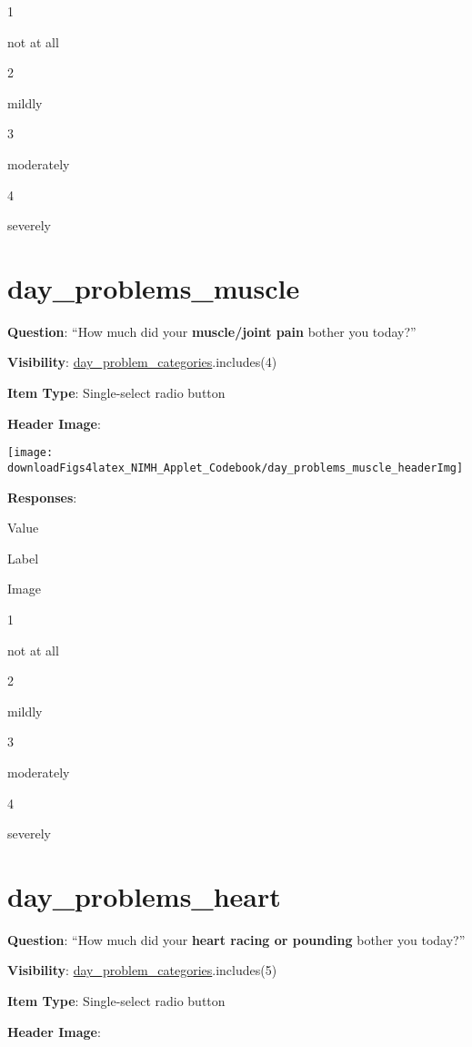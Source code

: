 \documentclass[]{book}
\begin{document}
1

not at all

2

mildly

3

moderately

4

severely

\hypertarget{day_problems_muscle}{%
\section{day\_problems\_muscle}\label{day_problems_muscle}}

\textbf{Question}: ``How much did your \textbf{muscle/joint pain} bother you today?''

\textbf{Visibility}: \protect\hyperlink{day_problem_categories}{day\_problem\_categories}.includes(4)

\textbf{Item Type}: Single-select radio button

\textbf{Header Image}:

\begin{flushleft}\texttt{[image: downloadFigs4latex\_NIMH\_Applet\_Codebook/day\_problems\_muscle\_headerImg]} \end{flushleft}

\textbf{Responses}:

Value

Label

Image

1

not at all

2

mildly

3

moderately

4

severely

\hypertarget{day_problems_heart}{%
\section{day\_problems\_heart}\label{day_problems_heart}}

\textbf{Question}: ``How much did your \textbf{heart racing or pounding} bother you today?''

\textbf{Visibility}: \protect\hyperlink{day_problem_categories}{day\_problem\_categories}.includes(5)

\textbf{Item Type}: Single-select radio button

\textbf{Header Image}:
\end{document}
